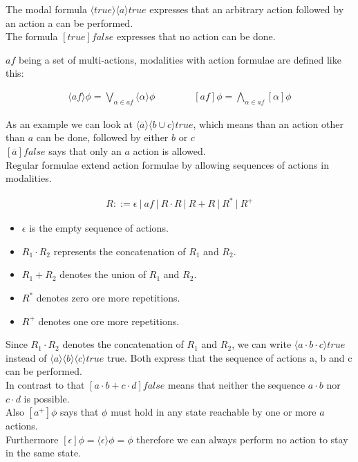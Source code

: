 \documentclass{clseminar}
\begin{document}
  The modal formula $\langle true \rangle \langle a \rangle true$ expresses that an arbitrary action followed by an action a can be performed. \\
  The formula $[true]false$ expresses that no action can be done.

  $\mathit{af}$ being a set of multi-actions, modalities with action formulae are defined like this:

  \begin{align*}
    \langle{\mathit{af}}\rangle\phi = \bigvee_{\alpha \in \mathit{af}} \langle\alpha\rangle\phi
    \qquad\qquad
    [\mathit{af}]\phi = \bigwedge_{\alpha \in \mathit{af}} [\alpha]\phi
  \end{align*}

  As an example we can look at $\langle\overline{a}\rangle\langle{b \cup c}\rangle\mathit{true}$, which means than an action other than $a$ can be done, followed by either $b$ or $c$ \\
  $[\overline{a}]\mathit{false}$ says that only an $a$ action is allowed. \\

  Regular formulae extend action formulae by allowing sequences of actions in modalities.

  \begin{align*}
    R ::= \epsilon\ |\ \mathit{af}\ |\ R\cdot{R}\ |\ R+R\ |\ R^*\ |\ R^+
  \end{align*}

  \begin{itemize}
    \item $\epsilon$ is the empty sequence of actions.
    \item $R_1\cdot{R_2}$ represents the concatenation of $R_1$ and $R_2$.
    \item $R_1+R_2$ denotes the union of  $R_1$ and $R_2$.
    \item $R^*$ denotes zero ore more repetitions.
    \item $R^+$ denotes one ore more repetitions.
  \end{itemize}

  Since $R_1\cdot{R_2}$ denotes the concatenation of $R_1$ and $R_2$, we can write $\langle a \cdot b \cdot c \rangle true$ instead of $\langle a \rangle \langle b \rangle \langle c \rangle true$ true. Both express that the sequence of actions a, b and c can be performed. \\
  In contrast to that $[a\cdot{b} + c\cdot{d}]\mathit{false}$ means that neither the sequence $a\cdot{b}$ nor $c\cdot{d}$ is possible. \\
  Also $[a^+]\phi$ says that $\phi$ must hold in any state reachable by one or more $a$ actions. \\
  Furthermore $[\epsilon]\phi = \langle \epsilon \rangle \phi = \phi$ therefore we can always perform no action to stay in the same state. \\
\end{document}
